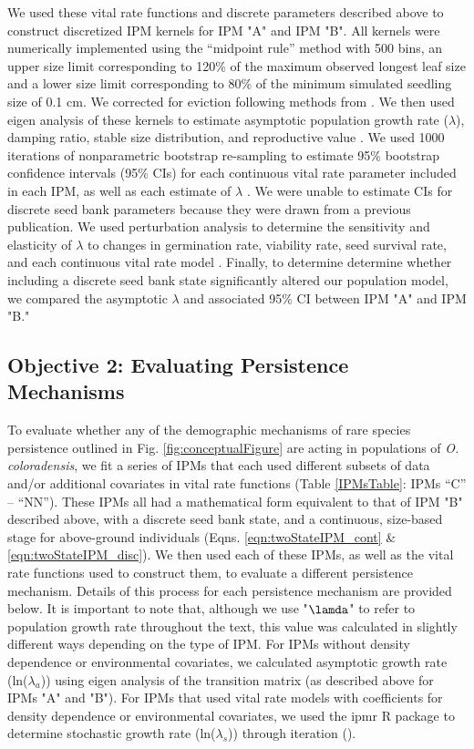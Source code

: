 \documentclass[12pt, letterpaper]{article}
\begin{document}
We used these vital rate functions and discrete parameters described above to construct discretized IPM kernels for IPM "A" and IPM "B". All kernels were numerically implemented using the “midpoint rule” method \cite{Easterling2000} with 500 bins, an upper size limit corresponding to 120\% of the maximum observed longest leaf size and a lower size limit corresponding to 80\% of the minimum simulated seedling size of 0.1 cm. We corrected for eviction following methods from \cite{Williams2012-xs}. We then used eigen analysis of these kernels to estimate asymptotic population growth rate ($\lambda$), damping ratio, stable size distribution, and reproductive value \cite{Caswell2001MatrixInterpretation, Ellner2016Data-drivenPopulations}. We used 1000 iterations of nonparametric bootstrap re-sampling to estimate 95\% bootstrap confidence intervals (95\% CIs) for each continuous vital rate parameter included in each IPM, as well as each estimate of $\lambda$ \cite{Merow2014AdvancingGuide, Fieberg2020Resampling-basedBiologists}. We were unable to estimate CIs for discrete seed bank parameters because they were drawn from a previous publication. We used perturbation analysis to determine the sensitivity and elasticity of $\lambda$ to changes in germination rate, viability rate, seed survival rate, and each continuous vital rate model \cite{Morris2002QuantitativeAnalysis}. Finally, to determine determine whether including a discrete seed bank state significantly altered our population model, we compared the asymptotic $\lambda$ and associated 95\% CI between IPM "A" and IPM "B." 

\subsection{Objective 2: Evaluating Persistence Mechanisms}
To evaluate whether any of the demographic mechanisms of rare species persistence outlined in Fig. \ref{fig:conceptualFigure} are acting in populations of \textit{O. coloradensis}, we fit a series of IPMs that each used different subsets of data and/or additional covariates in vital rate functions (Table \ref{IPMsTable}: IPMs “C” – “NN”). These IPMs all had a mathematical form equivalent to that of IPM "B" described above, with a discrete seed bank state, and a continuous, size-based stage for above-ground individuals (Eqns. \ref{eqn:twoStateIPM_cont} \& \ref{eqn:twoStateIPM_disc}). We then used each of these IPMs, as well as the vital rate functions used to construct them, to evaluate a different persistence mechanism. Details of this process for each persistence mechanism are provided below. It is important to note that, although we use "$\lamda$" to refer to population growth rate throughout the text, this value was calculated in slightly different ways depending on the type of IPM. For IPMs without density dependence or environmental covariates, we calculated asymptotic growth rate (ln($\lambda_a$)) using eigen analysis of the transition matrix (as described above for IPMs "A" and "B"). For IPMs that used vital rate models with coefficients for density dependence or environmental covariates, we used the ipmr R package to determine stochastic growth rate (ln($\lambda_s$)) through iteration (\cite{Levin2021Ipmr:R}). 
\end{document}
